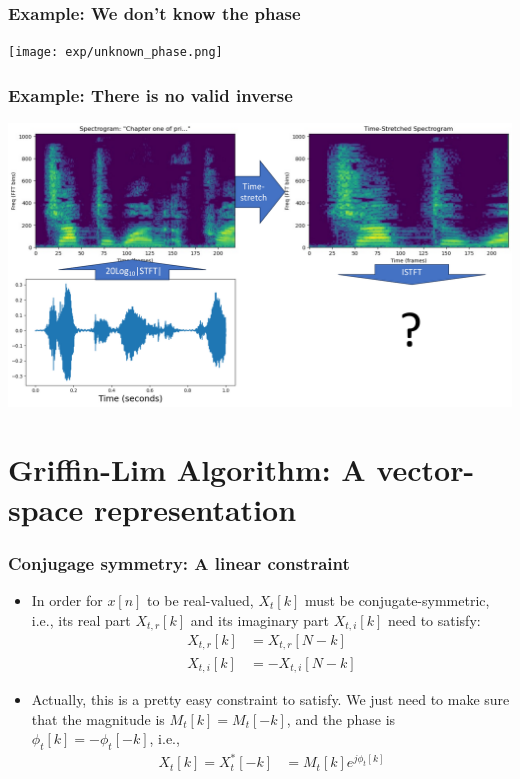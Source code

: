 \documentclass{beamer}
\begin{document}
\begin{frame}
  \frametitle{Example: We don't know the phase}
  \centerline{\texttt{[image: exp/unknown\_phase.png]}}
\end{frame}

\begin{frame}
  \frametitle{Example: There is no valid inverse}
  \centerline{\includegraphics[height=0.8\textheight]{timestretch.pdf}}
\end{frame}

\section[Vectors]{Griffin-Lim Algorithm: A vector-space representation}
\setcounter{subsection}{1}

\begin{frame}
  \frametitle{Conjugage symmetry: A linear constraint}
  
  \begin{itemize}
  \item In order for $x[n]$ to be real-valued, $X_t[k]$ must be
    conjugate-symmetric, i.e., its real part $X_{t,r}[k]$ and its
    imaginary part $X_{t,i}[k]$ need to satisfy:
    \begin{align*}
      X_{t,r}[k] &= X_{t,r}[N-k]\\
      X_{t,i}[k] &= -X_{t,i}[N-k]
    \end{align*}
  \item Actually, this is a pretty easy constraint to satisfy.  We
    just need to make sure that the magnitude is $M_t[k]=M_t[-k]$, and
    the phase is $\phi_t[k]=-\phi_t[-k]$, i.e.,
    \begin{align*}
      X_t[k]=X_t^*[-k]&= M_t[k]e^{j\phi_t[k]}
    \end{align*}
  \end{itemize}
\end{frame}
    
\end{document}
